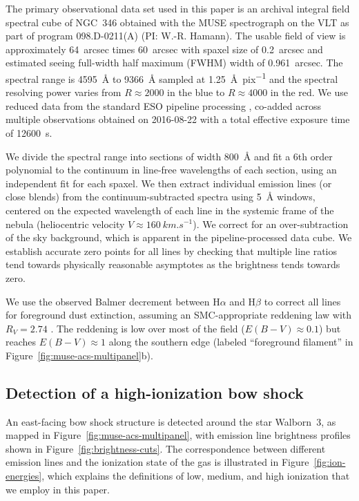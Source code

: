 \documentclass[twocolumn, times]{aastex631}
\newcommand\ha{\ensuremath{\text{H}\alpha}}
\newcommand\hb{\ensuremath{\text{H}\beta}}
\begin{document}
The primary observational data set used in this paper
is an archival integral field spectral cube of NGC~346
obtained with the MUSE spectrograph \citep{Bacon:2010a, Bacon:2014a}
on the VLT as part of program 098.D-0211(A) (PI:  W.-R. Hamann). 
The usable field of view is approximately
\SI{64}{arcsec} times \SI{60}{arcsec} with
spaxel size of \SI{0.2}{arcsec} and estimated seeing
full-width half maximum (FWHM) width of \SI{0.961}{arcsec}.
The spectral range is \SI{4595}{\angstrom} to \SI{9366}{\angstrom}
sampled at \SI{1.25}{\angstrom.pix^{-1}} and the
spectral resolving power varies from \(R \approx 2000\) in the blue
to \(R \approx 4000\) in the red.
We use reduced data from the standard ESO pipeline processing
\citep{Weilbacher:2020a},
co-added across multiple observations obtained on \mbox{2016-08-22}
with a total effective exposure time of \SI{12600}{s}.

We divide the spectral range into sections of width \SI{800}{\angstrom}
and fit a 6th order polynomial to the continuum
in line-free wavelengths of each section,
using an independent fit for each spaxel.
We then extract individual emission lines (or close blends)
from the continuum-subtracted spectra using \SI{5}{\angstrom} windows,
centered on the expected wavelength of each line
in the systemic frame of the nebula
(heliocentric velocity \(V \approx \SI{+160}{km.s^{-1}}\)).
We correct for an over-subtraction of the sky background,
which is apparent in the pipeline-processed data cube.
We establish accurate zero points for all lines by checking that
multiple line ratios tend towards physically reasonable asymptotes
as the brightness tends towards zero.

We use the observed Balmer decrement between \ha{} and \hb{} to
correct all lines for foreground dust extinction, assuming
an SMC-appropriate reddening law with \(R_V = 2.74\)
\citep{Fitzpatrick:1990a, Gordon:2003l}.
The reddening is low over most of the field
(\(E(B - V) \approx 0.1\))
but reaches \(E(B - V) \approx 1\) along the southern edge
(labeled ``foreground filament'' in
Figure~\ref{fig:muse-acs-multipanel}b).


\subsection{Detection of a high-ionization bow shock}
\label{sec:results}
An east-facing bow shock structure is detected
around the star Walborn~3,
as mapped in Figure~\ref{fig:muse-acs-multipanel},
with emission line brightness profiles shown in
Figure~\ref{fig:brightness-cuts}.
The correspondence between different emission lines
and the ionization state of the gas is illustrated
in Figure~\ref{fig:ion-energies},
which explains the definitions of low, medium, and
high ionization that we employ in this paper.
\end{document}
